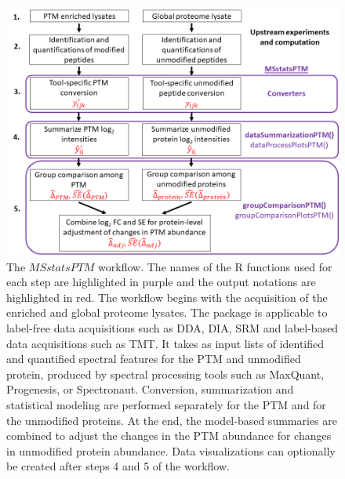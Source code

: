 \documentclass[mcp]{article}
\numberwithin{table}{section}
\begin{document}
\begin{figure}[ht]
\centering
\includegraphics[scale=.5]{images/MSstatsPTM_design.png}
\caption{The $MSstatsPTM$ workflow. The names of the R functions used for each step are highlighted in purple and the output notations are highlighted in red. The workflow begins with the acquisition of the enriched and global proteome lysates. The package is applicable to label-free data acquisitions such as DDA, DIA, SRM and label-based data acquisitions such as TMT. It takes as input lists of identified and quantified spectral features for the PTM and unmodified protein, produced by spectral processing tools such as MaxQuant, Progenesis, or Spectronaut.  Conversion, summarization and statistical modeling are performed separately for the PTM and for the unmodified proteins. At the end, the model-based summaries are combined to adjust the changes in the PTM abundance for changes in unmodified protein abundance. Data visualizations can optionally be created after steps 4 and 5 of the workflow.}
\label{fig:msstatsptm_design}
\end{figure}
\end{document}

